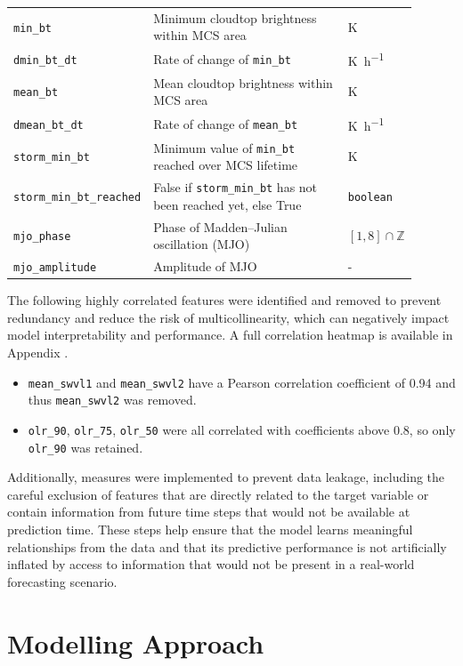 {\begin{longtable}{>{\raggedright\arraybackslash}p{0.25\linewidth} p{0.50\linewidth} >{\raggedright\arraybackslash}p{0.15\linewidth}}
    \texttt{min\_bt} & Minimum cloudtop brightness within MCS area & \unit{\kelvin} \\
    \texttt{dmin\_bt\_dt} & Rate of change of \texttt{min\_bt} & \unit{\kelvin\per\hour} \\
    \texttt{mean\_bt} & Mean cloudtop brightness within MCS area & \unit{\kelvin} \\
    \texttt{dmean\_bt\_dt} & Rate of change of \texttt{mean\_bt} & \unit{\kelvin\per\hour} \\
    \texttt{storm\_min\_bt} & Minimum value of \texttt{min\_bt} reached over MCS lifetime & \unit{\kelvin} \\
    \texttt{storm\_min\_bt\_reached} & False if \texttt{storm\_min\_bt} has not been reached yet, else True & \texttt{boolean} \\
    \texttt{mjo\_phase} & Phase of Madden--Julian oscillation (MJO) & $[1, 8] \cap \mathbb{Z}$ \\
    \texttt{mjo\_amplitude} & Amplitude of MJO & - \\
\end{longtable}
}

The following highly correlated features were identified and removed to prevent redundancy and reduce the risk of multicollinearity, which can negatively impact model interpretability and performance.  A full correlation heatmap is available in Appendix .
\begin{itemize}
    \item \texttt{mean\_swvl1} and \texttt{mean\_swvl2} have a Pearson correlation coefficient of 0.94 and thus \texttt{mean\_swvl2} was removed.
    \item \texttt{olr\_90}, \texttt{olr\_75}, \texttt{olr\_50} were all correlated with coefficients above 0.8, so only \texttt{olr\_90} was retained.
\end{itemize}
Additionally, measures were implemented to prevent data leakage, including the careful exclusion of features that are directly related to the target variable or contain information from future time steps that would not be available at prediction time. These steps help ensure that the model learns meaningful relationships from the data and that its predictive performance is not artificially inflated by access to information that would not be present in a real-world forecasting scenario.

\section{Modelling Approach}

